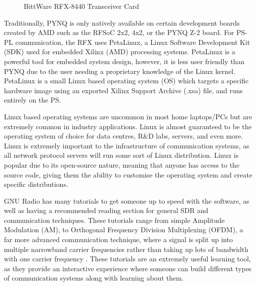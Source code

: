 \documentclass[12pt, a4paper]{article}
\begin{document}
\begin{figure}[h]
    \centering
    
    \caption{BittWare RFX-8440 Transceiver Card}
    \label{fig:RFX_pic}
\end{figure}

Traditionally, PYNQ is only natively available on certain development boards created by AMD such as the RFSoC 2x2, 4x2, or the PYNQ Z-2 board. For PS-PL communication, the RFX uses PetaLinux, a Linux Software Development Kit (SDK) used for embedded Xilinx (AMD) processing systems. PetaLinux is a powerful tool for embedded system design, however, it is less user friendly than PYNQ due to the user needing a proprietary knowledge of the Linux kernel. PetaLinux is a small Linux based operating system (OS) which targets a specific hardware image using an exported Xilinx Support Archive (.xsa) file, and runs entirely on the PS.

Linux based operating systems are uncommon in most home laptops/PCs but are extremely common in industry applications. Linux is almost guaranteed to be the operating system of choice for data centres, R\&D labs, servers, and even more. Linux is extremely important to the infrastructure of communication systems, as all network protocol servers will run some sort of Linux distribution. Linux is popular due to its open-source nature, meaning that anyone has access to the source code, giving them the ability to customise the operating system and create specific distributions. 

GNU Radio has many tutorials to get someone up to speed with the software, as well as having a recommended reading section for general SDR and communication techniques. These tutorials range from simple Amplitude Modulation (AM), to Orthogonal Frequency Division Multiplexing (OFDM), a far more advanced communication technique, where a signal is split up into multiple narrowband carrier frequencies rather than taking up lots of bandwidth with one carrier frequency \cite{ofdm_paper}. These tutorials are an extremely useful learning tool, as they provide an interactive experience where someone can build different types of communication systems along with learning about them.
\end{document}
